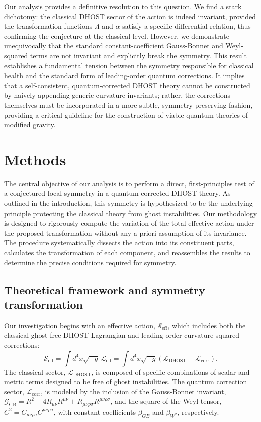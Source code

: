 \documentclass[twocolumn]{aastex631}
\begin{document}
Our analysis provides a definitive resolution to this question. We find a stark dichotomy: the classical DHOST sector of the action is indeed invariant, provided the transformation functions $\Lambda$ and $\alpha$ satisfy a specific differential relation, thus confirming the conjecture at the classical level. However, we demonstrate unequivocally that the standard constant-coefficient Gauss-Bonnet and Weyl-squared terms are not invariant and explicitly break the symmetry. This result establishes a fundamental tension between the symmetry responsible for classical health and the standard form of leading-order quantum corrections. It implies that a self-consistent, quantum-corrected DHOST theory cannot be constructed by naively appending generic curvature invariants; rather, the corrections themselves must be incorporated in a more subtle, symmetry-preserving fashion, providing a critical guideline for the construction of viable quantum theories of modified gravity.


\section{Methods}
\label{sec:methods}
The central objective of our analysis is to perform a direct, first-principles test of a conjectured local symmetry in a quantum-corrected DHOST theory. As outlined in the introduction, this symmetry is hypothesized to be the underlying principle protecting the classical theory from ghost instabilities. Our methodology is designed to rigorously compute the variation of the total effective action under the proposed transformation without any a priori assumption of its invariance. The procedure systematically dissects the action into its constituent parts, calculates the transformation of each component, and reassembles the results to determine the precise conditions required for symmetry.

\subsection{Theoretical framework and symmetry transformation}

Our investigation begins with an effective action, $\mathcal{S}_{\text{eff}}$, which includes both the classical ghost-free DHOST Lagrangian and leading-order curvature-squared corrections:
\begin{equation}
    \mathcal{S}_{\text{eff}} = \int d^4x \sqrt{-g} \, \mathcal{L}_{\text{eff}} = \int d^4x \sqrt{-g} \left( \mathcal{L}_{\text{DHOST}} + \mathcal{L}_{\text{corr}} \right).
\end{equation}
The classical sector, $\mathcal{L}_{\text{DHOST}}$, is composed of specific combinations of scalar and metric terms designed to be free of ghost instabilities. The quantum correction sector, $\mathcal{L}_{\text{corr}}$, is modeled by the inclusion of the Gauss-Bonnet invariant, $\mathcal{G}_{\text{GB}} = R^2 - 4R_{\mu\nu}R^{\mu\nu} + R_{\mu\nu\rho\sigma}R^{\mu\nu\rho\sigma}$, and the square of the Weyl tensor, $C^2 = C_{\mu\nu\rho\sigma}C^{\mu\nu\rho\sigma}$, with constant coefficients $\beta_{GB}$ and $\beta_{W^2}$, respectively.
\end{document}
